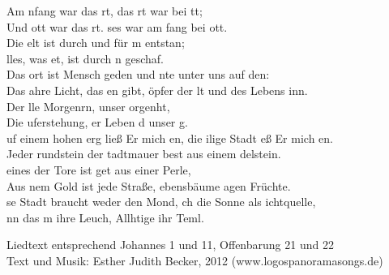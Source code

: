 
Am nfang war das rt, das rt war bei tt;\\
Und ott war das rt. ses war am fang bei ott.\\
Die elt ist durch  und für m entstan;\\
lles, was et, ist durch n geschaf.\\

Das ort ist Mensch geden und nte unter uns auf den:\\
Das ahre Licht, das en gibt, öpfer der lt und des Lebens inn.\\
Der lle Morgenrn, unser orgenht,\\
Die uferstehung, er Leben d unser g.\\

uf einem hohen erg ließ Er mich en, die ilige Stadt eß Er mich en.\\
Jeder rundstein der tadtmauer best aus einem delstein.\\
 eines der Tore ist get aus einer Perle,\\ 
Aus nem Gold ist jede Straße, ebensbäume agen Früchte.\\
se Stadt braucht weder den Mond, ch die Sonne als ichtquelle,\\
nn das m  ihre Leuch,  Allhtige  ihr Teml.\\

\begin{footnotesize}
Liedtext entsprechend Johannes 1 und 11, Offenbarung 21 und 22\\
Text und Musik: Esther Judith Becker, 2012 (www.logospanoramasongs.de)
\end{footnotesize}